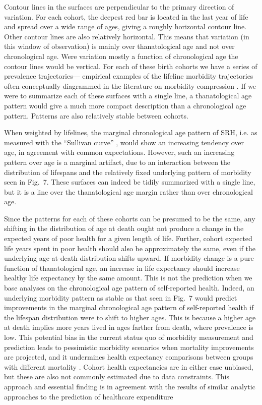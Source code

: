 \documentclass{bmcart}
\theoremstyle{definition}
\begin{document}
 Contour lines in the surfaces are perpendicular to the primary direction of
 variation.
 For each cohort, the deepest red bar is located in the last
 year of life and spread over a wide range of ages, giving a roughly horizontal contour line.
Other contour lines are also relatively horizontal. This means that variation
(in this window of observation) is mainly over thanatological age and not over
chronological age. Were variation mostly a function of chronological age the
contour lines would be vertical. For each of these birth cohorts we have a series of prevalence trajectories---
empirical examples of the lifeline morbidity trajectories often conceptually
diagrammed in the literature on morbidity compression
\citep[e.g.,][]{fries2005frailty}. If we were to summarize each of
these surfaces with a single line, a thanatological age pattern would give a
much more compact description than a chronological age pattern. Patterns are
also relatively stable between cohorts.

When weighted by lifelines, the marginal chronological age pattern of SRH,
i.e. as measured with the ``Sullivan curve'' \citep{Sullivan1970}, would show an
increasing tendency over age, in agreement with common expectations.
However, such an increasing pattern over age is a marginal artifact, due to an
interaction between the distribution of lifespans and the relatively fixed underlying
pattern of morbidity seen in Fig.~7. These surfaces can indeed
be tidily summarized with a single line, but it is a line over the
thanatological age margin rather than over chronological age. 

Since the patterns for each of these cohorts can be presumed to be the same, any
shifting in the distribution of age at death ought not produce a change in the
expected years of poor health for a given length of life. Further, cohort
expected life years spent in poor health should also be approximately the same,
even if the underlying age-at-death distribution shifts upward. If morbidity
change is a pure function of thanatological age, an increase in life expectancy
should increase healthy life expectancy by the same amount. This is not the
prediction when we base analyses on the chronological age pattern of
self-reported health. Indeed, an underlying morbidity pattern as stable as
that seen in Fig.~7 would predict improvements in the marginal
chronological age pattern of self-reported health if the lifespan distribution
were to shift to higher ages. This is because a higher age at death implies
more years lived in ages farther from death, where prevalence is low.
This potential bias in the current status quo of morbidity measurement and
prediction leads to pessimistic morbidity scenarios when mortality improvements
are projected, and it undermines health expectancy comparisons between groups
with different mortality \citep{vanRaalte2015HLE}.
Cohort health expectancies are in either case unbiased, but these are also not
commonly estimated due to data constraints. This approach and essential finding
is in agreement with the results of similar analytic approaches to the
prediction of healthcare expenditure
\citep[e.g.,][]{miller2001increasing,Geue2014}
\end{document}
